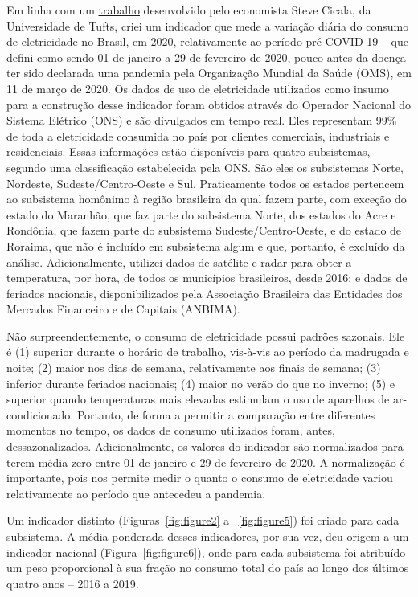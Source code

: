 \documentclass[12pt]{article}
\begin{document}
Em linha com um \href{https://home.uchicago.edu/~scicala/papers/real_time_EU/real_time_EU.pdf}{trabalho} desenvolvido pelo economista Steve Cicala, da Universidade de Tufts, criei um indicador que mede a variação diária do consumo de eletricidade no Brasil, em 2020, relativamente ao período pré COVID-19 -- que defini como sendo 01 de janeiro a 29 de fevereiro de 2020, pouco antes da doença ter sido declarada uma pandemia pela Organização Mundial da Saúde (OMS), em 11 de março de 2020. Os dados de uso de eletricidade utilizados como insumo para a construção desse indicador foram obtidos através do Operador Nacional do Sistema Elétrico (ONS) e são divulgados em tempo real. Eles representam 99\% de toda a eletricidade consumida no país por clientes comerciais, industriais e residenciais. Essas informações estão disponíveis para quatro subsistemas, segundo uma classificação estabelecida pela ONS. São eles os subsistemas Norte, Nordeste, Sudeste/Centro-Oeste e Sul. Praticamente todos os estados pertencem ao subsistema homônimo à região brasileira da qual fazem parte, com exceção do estado do Maranhão, que faz parte do subsistema Norte, dos estados do Acre e Rondônia, que fazem parte do subsistema Sudeste/Centro-Oeste, e do estado de Roraima, que não é incluído em subsistema algum e que, portanto, é excluído da análise. Adicionalmente, utilizei dados de satélite e radar para obter a temperatura, por hora, de todos os municípios brasileiros, desde 2016; e dados de feriados nacionais, disponibilizados pela Associação Brasileira das Entidades dos Mercados Financeiro e de Capitais (ANBIMA).

Não surpreendentemente, o consumo de eletricidade possui padrões sazonais. Ele é (1) superior durante o horário de trabalho, vis-à-vis ao período da madrugada e noite; (2) maior nos dias de semana, relativamente aos finais de semana; (3) inferior durante feriados nacionais; (4) maior no verão do que no inverno; (5) e superior quando temperaturas mais elevadas estimulam o uso de aparelhos de ar-condicionado. Portanto, de forma a permitir a comparação entre diferentes momentos no tempo, os dados de consumo utilizados foram, antes, dessazonalizados. Adicionalmente, os valores do indicador são normalizados para terem média zero entre 01 de janeiro e 29 de fevereiro de 2020. A normalização é importante, pois nos permite medir o quanto o consumo de eletricidade variou relativamente ao período que antecedeu a pandemia. 

Um indicador distinto (Figuras~{\ref{fig:figure2}} a ~{\ref{fig:figure5}}) foi criado para cada subsistema. A média ponderada desses indicadores, por sua vez, deu origem a um indicador nacional (Figura~{\ref{fig:figure6}}), onde para cada subsistema foi atribuído um peso proporcional à sua fração no consumo total do país ao longo dos últimos quatro anos -- 2016 a 2019. 
\end{document}

